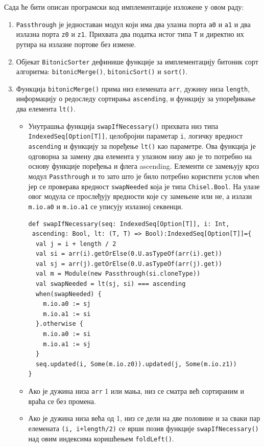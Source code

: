 \documentclass[12pt, a4paper]{article}
\theoremstyle{definition}
\begin{document}
Сада ће бити описан програмски код имплементације изложене у овом раду:
\begin{enumerate}
\item \verb+Passthrough+ је једноставан модул који има два улазна порта \verb+a0+ и \verb+a1+ и два излазна порта \verb+z0+ и \verb+z1+. Прихвата два податка истог типа \verb+T+ и директно их рутира на излазне портове без измене.

\item Објекат \verb+BitonicSorter+ дефинише функције за имплементацију битоник сорт алгоритма: \verb+bitonicMerge()+, \verb+bitonicSort()+ и \verb+sort()+.

\item Функција \verb+bitonicMerge()+ прима низ елемената \verb+arr+, дужину низа \verb+length+, информацију о редоследу сортирања \verb+ascending+, и функцију за упоређивање два елемента \verb+lt()+.
\begin{itemize}
\item Унутрашња функција \verb+swapIfNecessary()+ прихвата низ типа \verb+IndexedSeq[Option[T]]+, целобројни параметар \verb+i+, логичку вредност \verb+ascending+ и функцију за поређење \verb+lt()+ као параметре.
Ова функција је одговорна за замену два елемента у улазном низу ако је то потребно на основу функције поређења и флега ascending. Елементи се замењују кроз модул \verb+Passthrough+ и то зато што је било потребно користити услов \verb+when+ јер се проверава вредност \verb+swapNeeded+ која је типа \verb+Chisel.Bool+.
\newpage
На улазе овог модула се прослеђују вредности које су замењене или не, а излази \verb+m.io.a0+ и \verb+m.io.a1+ се уписују излазној секвенци.
\begin{verbatim}
def swapIfNecessary(seq: IndexedSeq[Option[T]], i: Int,
 ascending: Bool, lt: (T, T) => Bool):IndexedSeq[Option[T]]={
  val j = i + length / 2
  val si = arr(i).getOrElse(0.U.asTypeOf(arr(i).get))
  val sj = arr(j).getOrElse(0.U.asTypeOf(arr(j).get))
  val m = Module(new Passthrough(si.cloneType))
  val swapNeeded = lt(sj, si) === ascending
  when(swapNeeded) {
    m.io.a0 := sj
    m.io.a1 := si
  }.otherwise {
    m.io.a0 := si
    m.io.a1 := sj
  }
  seq.updated(i, Some(m.io.z0)).updated(j, Some(m.io.z1))
}
\end{verbatim}
\item Ако је дужина низа \verb+arr+ 1 или мања, низ се сматра већ сортираним и враћа се без промена.
\item Ако је дужина низа већа од 1, низ се дели на две половине и за сваки пар елемената \verb-(i, i+length/2)- се врши позив функције \verb+swapIfNecessary()+ над овим индексима коришћењем \verb+foldLeft()+.

\end{itemize}
\end{enumerate}
\end{document}
